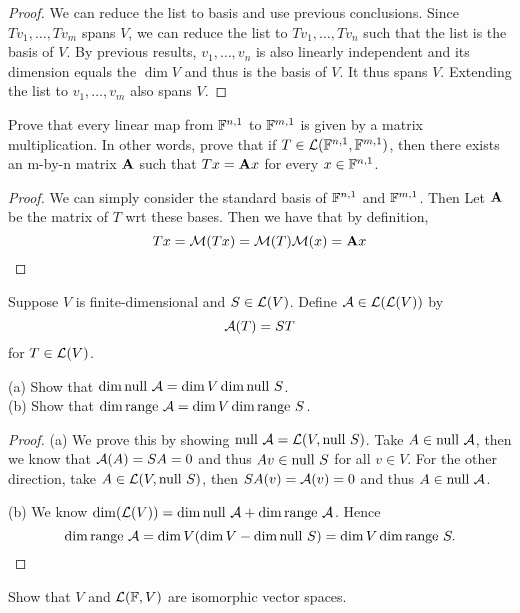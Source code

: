 \documentclass{extarticle}
\begin{document}
\begin{proof}
We can reduce the list to basis and use previous conclusions. Since \(T v_1, \ldots, T v_m\) spans \(V\), 
we can reduce the list to \(T v_1, \ldots, T v_n\) such that the list is the basis of \(V\). By previous 
results, \(v_1, \ldots, v_n\) is also linearly independent and its dimension equals the \(\dim V\) and thus 
is the basis of \(V\). It thus spans \(V\). Extending the list to \(v_1, \ldots, v_m\) also spans \(V\). 

\end{proof}


\begin{problem}{16}
    Prove that every linear map from \(\mathbb{F}^{n, 1}\) to \(\mathbb{F}^{m, 1}\) is given by a matrix multiplication. 
    In other words, prove that if \(T \in \mathcal{L}(\mathbb{F}^{n, 1}, \mathbb{F}^{m, 1})\), then there exists an m-by-n matrix 
    \(\mathbf{A}\) such that \(Tx =\mathbf{A} x\) for every \(x \in \mathbb{F}^{n, 1}\).
\end{problem}

\begin{proof}
We can simply consider the standard basis of \(\mathbb{F}^{n, 1}\) and \(\mathbb{F}^{m, 1}\). Then Let \(\mathbf{A}\) be the matrix 
of \(T\) wrt these bases. Then we have that by definition, 
\[T x = \mathcal{M}(Tx) = \mathcal{M}(T) \mathcal{M}(x) = \mathbf{A} x\]
\end{proof}

\begin{problem}{17}
    Suppose \(V\) is finite-dimensional and \(S \in \mathcal{L}(V)\). Define \(\mathcal{A} \in \mathcal{L}(\mathcal{L}(V))\) by 
    \[\mathcal{A}(T) = ST\] 
    for \(T \in \mathcal{L}(V)\). 

    (a) Show that \(\dim \text{null } \mathcal{A} = \dim V \dim \text{null } S\). \\ 
    (b) Show that \(\dim \text{range } \mathcal{A} = \dim V \dim \text{range } S\). 
\end{problem}

\begin{proof}
(a) We prove this by showing \(\text{null } \mathcal{A} = \mathcal{L}(V,\text{null } S)\). Take \(A \in \text{null } \mathcal{A}\), then we know that 
\(\mathcal{A} (A) = SA = 0\) and thus \(Av \in \text{null } S\) for all \(v \in V\). For the other direction, take 
\(A \in \mathcal{L}(V, \text{null } S)\), then \(SA(v) = \mathcal{A}(v) = 0\) and thus \(A \in \text{null } \mathcal{A}\). 

(b) We know \(\dim (\mathcal{L}(V)) = \dim \text{null } \mathcal{A} + \dim \text{range } \mathcal{A}\). Hence 
\[\dim \text{range } \mathcal{A} = \dim V (\dim V - \dim \text{null } S) = \dim V \dim \text{range } S.\]
\end{proof}


\begin{problem}{18}
    Show that \(V\) and \(\mathcal{L}(\mathbb{F}, V)\) are isomorphic vector spaces. 
\end{problem}
\end{document}
